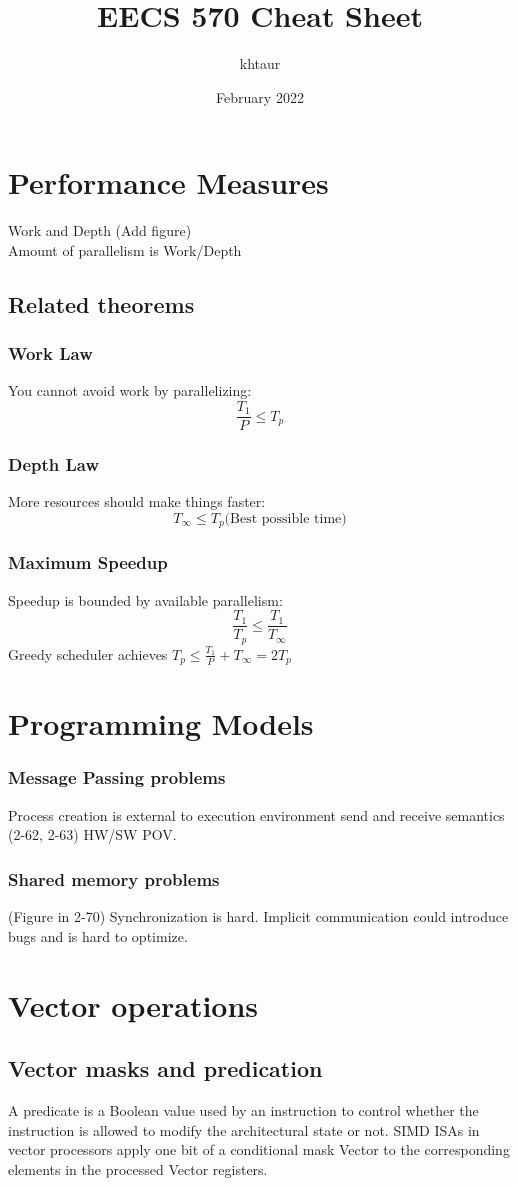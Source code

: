 \documentclass{article}
\title{EECS 570 Cheat Sheet}
\author{khtaur }
\date{February 2022}
\begin{document}
\begin{multicols*}{2}

\section{Performance Measures}
Work and Depth (Add figure) \\
Amount of parallelism is Work/Depth
\subsection{Related theorems}
\subsubsection{Work Law}
You cannot avoid work by parallelizing:
$$\frac{T_1}{P} \leq T_p$$
\subsubsection{Depth Law}
More resources should make things faster:
$$T_\infty \leq T_p \text{(Best possible time)}$$
\subsubsection{Maximum Speedup}
Speedup is bounded by available parallelism:
$$\frac{T_1}{T_p} \leq \frac{T_1}{T_\infty}$$
Greedy scheduler achieves $T_p \leq \frac{T_1}{P} + T_\infty = 2T_p$

\section{Programming Models}
\subsubsection{Message Passing problems}
Process creation is external to execution environment
send and receive semantics (2-62, 2-63)
HW/SW POV.

\subsubsection{Shared memory problems}
(Figure in 2-70) Synchronization is hard. Implicit communication could introduce bugs and is hard to optimize.

\section{Vector operations}
\subsection{Vector masks and predication}
A predicate is a Boolean value used by an instruction to control whether the instruction is allowed to modify the architectural state or not. SIMD ISAs in vector processors apply one bit of a conditional mask Vector to the corresponding elements in the processed Vector registers.


\end{multicols*}
\end{document}
